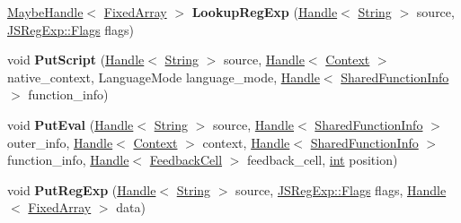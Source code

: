 \begin{DoxyCompactItemize}
\mbox{\label{classv8_1_1internal_1_1CompilationCache_a3936c774ccd71fa0be44b4c01c234e9b}} 
\mbox{\hyperlink{classv8_1_1internal_1_1MaybeHandle}{Maybe\+Handle}}$<$ \mbox{\hyperlink{classv8_1_1internal_1_1FixedArray}{Fixed\+Array}} $>$ {\bfseries Lookup\+Reg\+Exp} (\mbox{\hyperlink{classv8_1_1internal_1_1Handle}{Handle}}$<$ \mbox{\hyperlink{classv8_1_1internal_1_1String}{String}} $>$ source, \mbox{\hyperlink{classv8_1_1base_1_1Flags}{J\+S\+Reg\+Exp\+::\+Flags}} flags)
\item 
\mbox{\label{classv8_1_1internal_1_1CompilationCache_a00be060e10409a467fedf71979f6e689}} 
void {\bfseries Put\+Script} (\mbox{\hyperlink{classv8_1_1internal_1_1Handle}{Handle}}$<$ \mbox{\hyperlink{classv8_1_1internal_1_1String}{String}} $>$ source, \mbox{\hyperlink{classv8_1_1internal_1_1Handle}{Handle}}$<$ \mbox{\hyperlink{classv8_1_1internal_1_1Context}{Context}} $>$ native\+\_\+context, Language\+Mode language\+\_\+mode, \mbox{\hyperlink{classv8_1_1internal_1_1Handle}{Handle}}$<$ \mbox{\hyperlink{classv8_1_1internal_1_1SharedFunctionInfo}{Shared\+Function\+Info}} $>$ function\+\_\+info)
\item 
\mbox{\label{classv8_1_1internal_1_1CompilationCache_a37b56a9f2b7d6146f0077fc996c2804a}} 
void {\bfseries Put\+Eval} (\mbox{\hyperlink{classv8_1_1internal_1_1Handle}{Handle}}$<$ \mbox{\hyperlink{classv8_1_1internal_1_1String}{String}} $>$ source, \mbox{\hyperlink{classv8_1_1internal_1_1Handle}{Handle}}$<$ \mbox{\hyperlink{classv8_1_1internal_1_1SharedFunctionInfo}{Shared\+Function\+Info}} $>$ outer\+\_\+info, \mbox{\hyperlink{classv8_1_1internal_1_1Handle}{Handle}}$<$ \mbox{\hyperlink{classv8_1_1internal_1_1Context}{Context}} $>$ context, \mbox{\hyperlink{classv8_1_1internal_1_1Handle}{Handle}}$<$ \mbox{\hyperlink{classv8_1_1internal_1_1SharedFunctionInfo}{Shared\+Function\+Info}} $>$ function\+\_\+info, \mbox{\hyperlink{classv8_1_1internal_1_1Handle}{Handle}}$<$ \mbox{\hyperlink{classv8_1_1internal_1_1FeedbackCell}{Feedback\+Cell}} $>$ feedback\+\_\+cell, \mbox{\hyperlink{classint}{int}} position)
\item 
\mbox{\label{classv8_1_1internal_1_1CompilationCache_a9db56d1ad2334deec904f4e8617805d1}} 
void {\bfseries Put\+Reg\+Exp} (\mbox{\hyperlink{classv8_1_1internal_1_1Handle}{Handle}}$<$ \mbox{\hyperlink{classv8_1_1internal_1_1String}{String}} $>$ source, \mbox{\hyperlink{classv8_1_1base_1_1Flags}{J\+S\+Reg\+Exp\+::\+Flags}} flags, \mbox{\hyperlink{classv8_1_1internal_1_1Handle}{Handle}}$<$ \mbox{\hyperlink{classv8_1_1internal_1_1FixedArray}{Fixed\+Array}} $>$ data)

\end{DoxyCompactItemize}
